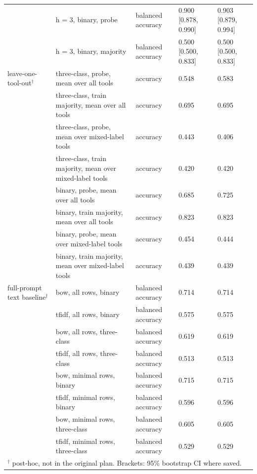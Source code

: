 \begin{tabular}{lllll}
 & h = 3, binary, probe & balanced accuracy & 0.900 [0.878, 0.990] & 0.903 [0.879, 0.994] \\
 & h = 3, binary, majority & balanced accuracy & 0.500 [0.500, 0.833] & 0.500 [0.500, 0.833] \\
\hline
leave-one-tool-out$^\dagger$ & three-class, probe, mean over all tools & accuracy & 0.548 & 0.583 \\
 & three-class, train majority, mean over all tools & accuracy & 0.695 & 0.695 \\
 & three-class, probe, mean over mixed-label tools & accuracy & 0.443 & 0.406 \\
 & three-class, train majority, mean over mixed-label tools & accuracy & 0.420 & 0.420 \\
 & binary, probe, mean over all tools & accuracy & 0.685 & 0.725 \\
 & binary, train majority, mean over all tools & accuracy & 0.823 & 0.823 \\
 & binary, probe, mean over mixed-label tools & accuracy & 0.454 & 0.444 \\
 & binary, train majority, mean over mixed-label tools & accuracy & 0.439 & 0.439 \\
\hline
full-prompt text baseline$^\dagger$ & bow, all rows, binary & balanced accuracy & 0.714 & 0.714 \\
 & tfidf, all rows, binary & balanced accuracy & 0.575 & 0.575 \\
 & bow, all rows, three-class & balanced accuracy & 0.619 & 0.619 \\
 & tfidf, all rows, three-class & balanced accuracy & 0.513 & 0.513 \\
 & bow, minimal rows, binary & balanced accuracy & 0.715 & 0.715 \\
 & tfidf, minimal rows, binary & balanced accuracy & 0.596 & 0.596 \\
 & bow, minimal rows, three-class & balanced accuracy & 0.605 & 0.605 \\
 & tfidf, minimal rows, three-class & balanced accuracy & 0.529 & 0.529 \\
\hline
\multicolumn{5}{l}{$^\dagger$ post-hoc, not in the original plan. Brackets: 95\% bootstrap CI where saved.} \\
\end{tabular}

